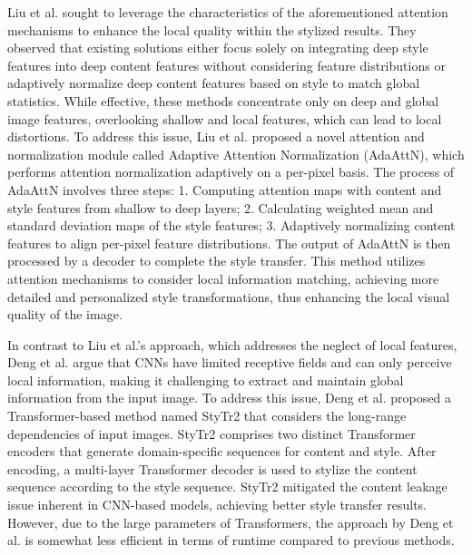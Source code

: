 Liu et al.\citep{48liu2021adaattn} sought to leverage the characteristics of the aforementioned attention mechanisms to enhance the local quality within the stylized results. They observed that existing solutions either focus solely on integrating deep style features into deep content features without considering feature distributions or adaptively normalize deep content features based on style to match global statistics\citep{04huang2017arbitrary,39dumoulin2016learned,41jing2020dynamic}. While effective, these methods concentrate only on deep and global image features, overlooking shallow and local features, which can lead to local distortions. To address this issue, Liu et al. proposed a novel attention and normalization module called Adaptive Attention Normalization (AdaAttN), which performs attention normalization adaptively on a per-pixel basis. The process of AdaAttN involves three steps: 1. Computing attention maps with content and style features from shallow to deep layers; 2. Calculating weighted mean and standard deviation maps of the style features; 3. Adaptively normalizing content features to align per-pixel feature distributions. The output of AdaAttN is then processed by a decoder to complete the style transfer. This method utilizes attention mechanisms to consider local information matching, achieving more detailed and personalized style transformations, thus enhancing the local visual quality of the image.

In contrast to Liu et al.’s approach, which addresses the neglect of local features, Deng et al.\citep{49deng2022stytr2} argue that CNNs have limited receptive fields and can only perceive local information, making it challenging to extract and maintain global information from the input image. To address this issue, Deng et al.\citep{49deng2022stytr2} proposed a Transformer-based method named StyTr2 that considers the long-range dependencies of input images. StyTr2 comprises two distinct Transformer encoders that generate domain-specific sequences for content and style. After encoding, a multi-layer Transformer decoder is used to stylize the content sequence according to the style sequence. StyTr2 mitigated the content leakage issue inherent in CNN-based models, achieving better style transfer results. However, due to the large parameters of Transformers, the approach by Deng et al.\citep{49deng2022stytr2} is somewhat less efficient in terms of runtime compared to previous methods.

